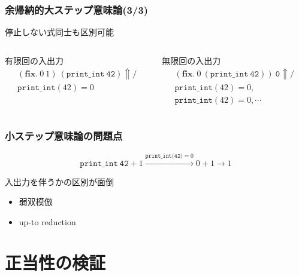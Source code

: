 \documentclass[dvipdfmx,cjk,xcolor=dvipsnames,envcountsect,notheorems,12pt]{beamer}
\theoremstyle{definition}
\newcommand{\keyword}[1]{\mathbf{#1}}
\newcommand{\FIX}{\keyword{fix}}
\begin{document}
\begin{frame}
	\frametitle{余帰納的大ステップ意味論(3/3)}
	\LARGE 停止しない式同士も区別可能

	\vfill

	\begin{columns}
		\begin{column}{0.5\textwidth}
			有限回の入出力
			{\normalsize \[\begin{array}{l}
				(\FIX.~0~1)~(\texttt{print\_int}~\texttt{42})\Uparrow / \\
				\texttt{print\_int}(42)=0
			\end{array}\]}
		\end{column}
		\begin{column}{0.5\textwidth}
			無限回の入出力
			{\normalsize \[\begin{array}{l}
				(\FIX.~0~(\texttt{print\_int}~\texttt{42}))~\texttt{0} \Uparrow / \\
				\texttt{print\_int}(42)=0, \\
				\texttt{print\_int}(42)=0, \cdots
			\end{array}\]}
		\end{column}
	\end{columns}
\end{frame}

\begin{frame}
	\frametitle{小ステップ意味論の問題点}
	\LARGE 
	{\normalsize \[\texttt{print\_int}~\texttt{42} + 1 \xrightarrow{\texttt{print\_int(42)}=0} 0 + 1 \longrightarrow 1 \]}

	\vfill

	入出力を伴うかの区別が面倒
	\begin{itemize}
		\item 弱双模倣
		\item up-to reduction
	\end{itemize}
\end{frame}

\section{正当性の検証}
\end{document}
